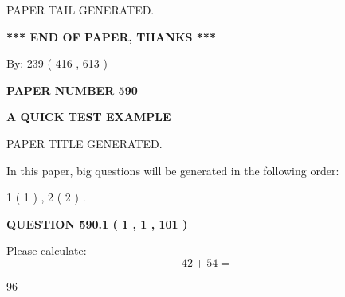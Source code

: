 \documentclass[12pt]{article}
\begin{document}
\vspace{2.0in} PAPER TAIL GENERATED.
   
   
   
   
\vspace{1.0in} 
{\textbf{\large{ *** END OF PAPER, THANKS *** }}} 
   
   
\hspace{1.0in} By: 
 239 ( 416 ,  613 )
   
   
   
   
\newpage 
\setcounter{page}{ 
   590001 } 
   
   
   
   
 {\textbf{ \Large{ PAPER NUMBER  590  }}}
   
   
\vspace{0.2in}
   
   
   
   
   
   
   
   
 \vspace{0.2in}
{\LARGE {\textbf{ A QUICK TEST EXAMPLE}}}
   
   
 PAPER TITLE GENERATED.
   
   
   
\vspace{0.2in}
   
In this paper, big questions will be generated in the following order: 
   
   
   1 ( 1 )
 ,
   2 ( 2 )
 .
  
\vspace{0.2in}
  
{\textbf{\Large{QUESTION
590.1 
 ( 1 , 1 , 101 )
}}}
  
  
 
Please calculate:
\begin{equation}
42 +  %
54 = \nonumber
\end{equation}
 
 
 
\noindent{}
 
 

96
 
 
\noindent{}
 
 

 
 
\end{document}
